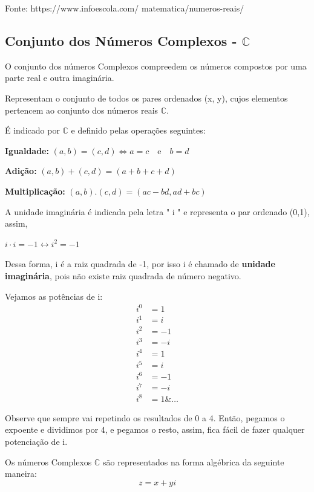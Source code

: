 \begin{multicols*}{2}


	Fonte: 	https://www.infoescola.com/
	matematica/numeros-reais/\\

	\subsection*{Conjunto dos Números Complexos - $\mathbb{C}$}

	O conjunto dos números Complexos compreedem os números compostos por uma parte real e outra imaginária.

	Representam o conjunto de todos os pares ordenados (x, y), cujos elementos pertencem ao conjunto dos números reais $\mathbb{C}$.

	É indicado por $\mathbb{C}$ e definido pelas operações seguintes:

	\textbf{Igualdade:} $(a, b) = (c, d) \Longleftrightarrow a = c  \quad \text{e} \quad b = d$

	\textbf{Adição:} $(a, b) + (c, d) = (a + b + c + d)$

	\textbf{Multiplicação:} $(a, b) . (c, d) = (ac - bd, ad + bc)$

	A unidade imaginária é indicada pela letra " i " e representa o par ordenado (0,1), assim,

	$ i \cdot i = -1 \leftrightarrow i^2 = -1$

	Dessa forma, i é a raiz quadrada de -1, por isso i é chamado de \textbf{unidade imaginária}, pois não existe raiz quadrada de número negativo.

	Vejamos as potências de i:
	\begin{align*}
		i^0 & = 1  \\
		i^1 & = i  \\
		i^2 & = -1 \\
		i^3 & = -i \\
		i^4 & = 1  \\
		i^5 & = i  \\
		i^6 & = -1 \\
		i^7 & = -i \\
		i^8 & = 1
		\&\dots
	\end{align*}

	Observe que sempre vai repetindo os resultados de 0 a 4. Então, pegamos o expoente e dividimos por 4, e pegamos o resto, assim, fica fácil de fazer qualquer potenciação de i.

	Os números Complexos $\mathbb{C}$ são representados na forma algébrica da seguinte maneira:
	\[z = x + yi\]


\end{multicols*}
